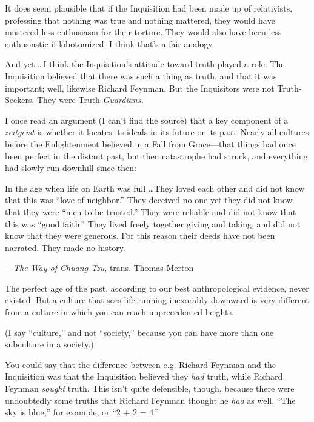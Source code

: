 {
 It does seem plausible that if the Inquisition had been made up of
relativists, professing that nothing was true and nothing mattered,
they would have mustered less enthusiasm for their torture. They would
also have been less enthusiastic if lobotomized. I think
that's a fair analogy.}

{
 And yet \ldots I think the Inquisition's attitude
toward truth played a role. The Inquisition believed that there was
such a thing as truth, and that it was important; well, likewise
Richard Feynman. But the Inquisitors were not Truth-Seekers. They were
Truth-\textit{Guardians.}}

{
 I once read an argument (I can't find the source)
that a key component of a \textit{zeitgeist} is whether it locates its
ideals in its future or its past. Nearly all cultures before the
Enlightenment believed in a Fall from Grace---that things had once been
perfect in the distant past, but then catastrophe had struck, and
everything had slowly run downhill since then:}

{
 In the age when life on Earth was full \ldots They loved each other
and did not know that this was ``love of
neighbor.'' They deceived no one yet they did not
know that they were ``men to be
trusted.'' They were reliable and did not know that
this was ``good faith.'' They lived
freely together giving and taking, and did not know that they were
generous. For this reason their deeds have not been narrated. They made
no history.}

{\raggedleft
 {}---\textit{The Way of Chuang Tzu}, trans. Thomas
Merton
\par}


\bigskip

{
 The perfect age of the past, according to our best anthropological
evidence, never existed. But a culture that sees life running
inexorably downward is very different from a culture in which you can
reach unprecedented heights.}

{
 (I say ``culture,'' and not
``society,'' because you can have
more than one subculture in a society.)}

{
 You could say that the difference between e.g. Richard Feynman and
the Inquisition was that the Inquisition believed they \textit{had}
truth, while Richard Feynman \textit{sought} truth. This
isn't quite defensible, though, because there were
undoubtedly some truths that Richard Feynman thought he \textit{had} as
well. ``The sky is blue,'' for
example, or ``2 + 2 = 4.''}

